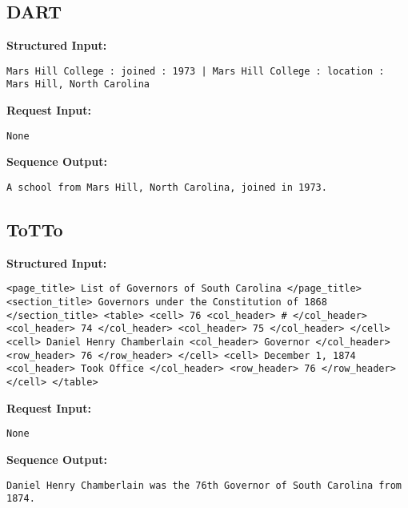 \documentclass[11pt]{article}
\begin{document}
\subsection{DART}
\textbf{Structured Input:} 
\begin{lstlisting}
Mars Hill College : joined : 1973 | Mars Hill College : location : Mars Hill, North Carolina
\end{lstlisting}
\textbf{Request Input:} 
\begin{lstlisting}
None
\end{lstlisting}
\textbf{Sequence Output:} 
\begin{lstlisting}
A school from Mars Hill, North Carolina, joined in 1973.
\end{lstlisting}

\subsection{ToTTo}
\textbf{Structured Input:} 
\begin{lstlisting}
<page_title> List of Governors of South Carolina </page_title> <section_title> Governors under the Constitution of 1868 </section_title> <table> <cell> 76 <col_header> # </col_header> <col_header> 74 </col_header> <col_header> 75 </col_header> </cell> <cell> Daniel Henry Chamberlain <col_header> Governor </col_header> <row_header> 76 </row_header> </cell> <cell> December 1, 1874 <col_header> Took Office </col_header> <row_header> 76 </row_header> </cell> </table>
\end{lstlisting}
\textbf{Request Input:} 
\begin{lstlisting}
None
\end{lstlisting}
\textbf{Sequence Output:} 
\begin{lstlisting}
Daniel Henry Chamberlain was the 76th Governor of South Carolina from 1874.
\end{lstlisting}
\end{document}
